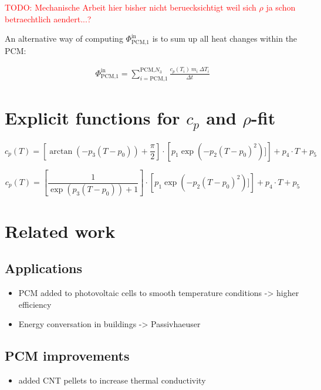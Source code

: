 \documentclass{scrartcl}[12pt, halfparskip]
\newcommand{\todo}[1]{\textcolor{red}{TODO: #1}}
\begin{document}
\todo{Mechanische Arbeit hier bisher nicht beruecksichtigt weil sich $\rho$ ja schon betraechtlich aendert...?}

An alternative way of computing $\Phi_{\text{PCM,}1}^{\text{in}}$ is to sum up all heat changes within the PCM:

\begin{align*}
	\Phi_{\text{PCM,1}}^{\text{in}} = \sum\limits_{i=\text{PCM,1}}^{\text{PCM,}N_3} \frac{c_p(T_i) \ m_i \ \Delta T_i}{\Delta t}
\end{align*}


\section{Explicit functions for $c_p$ and $\rho$-fit}

\begin{equation*}
	c_p(T) = \left[ \arctan (-p_3 (T-p_0)) + \frac{\pi}{2} \right] \cdot \left[ p_1 \exp(-p_2(T-p_0)^2)] \right] + p_4 \cdot T + p_5 
\end{equation*}


\begin{equation*}
	c_p(T) = \left[ \frac{1}{\exp(p_3(T-p_0)) + 1} \right] \cdot \left[ p_1 \exp(-p_2(T-p_0)^2)] \right] + p_4 \cdot T + p_5 
\end{equation*}

\section{Related work}
\subsection{Applications}
\begin{itemize}
	\item PCM added to photovoltaic cells to smooth temperature conditions -> higher efficiency \cite{pv-pcm}
	\item Energy conversation in buildings -> Passivhaeuser 
\end{itemize}

\subsection{PCM improvements}
\begin{itemize}
	\item added CNT pellets to increase thermal conductivity \cite{cnt_pellets}
\end{itemize}
\end{document}
